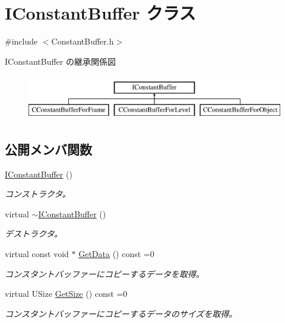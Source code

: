 \hypertarget{class_i_constant_buffer}{}\section{I\+Constant\+Buffer クラス}
\label{class_i_constant_buffer}


{\ttfamily \#include $<$Constant\+Buffer.\+h$>$}

I\+Constant\+Buffer の継承関係図\begin{figure}[H]
\begin{center}
\leavevmode
\includegraphics[height=2.000000cm]{class_i_constant_buffer}
\end{center}
\end{figure}
\subsection*{公開メンバ関数}
\begin{DoxyCompactItemize}
\item 
\hyperlink{class_i_constant_buffer_a48109ccf9035a26787b1357f34d4b89f}{I\+Constant\+Buffer} ()
\begin{DoxyCompactList}\small\item\em コンストラクタ。 \end{DoxyCompactList}\item 
virtual \hyperlink{class_i_constant_buffer_a323c41d765bb7d9293d3326b8482b827}{$\sim$\+I\+Constant\+Buffer} ()
\begin{DoxyCompactList}\small\item\em デストラクタ。 \end{DoxyCompactList}\item 
virtual const void $\ast$ \hyperlink{class_i_constant_buffer_a51d7e72f262e74f2018b480102dc795e}{Get\+Data} () const  =0
\begin{DoxyCompactList}\small\item\em コンスタントバッファーにコピーするデータを取得。 \end{DoxyCompactList}\item 
virtual U\+Size \hyperlink{class_i_constant_buffer_a527035ebacd73ffe5c5856f75220ac68}{Get\+Size} () const  =0
\begin{DoxyCompactList}\small\item\em コンスタントバッファーにコピーするデータのサイズを取得。 \end{DoxyCompactList}\end{DoxyCompactItemize}



